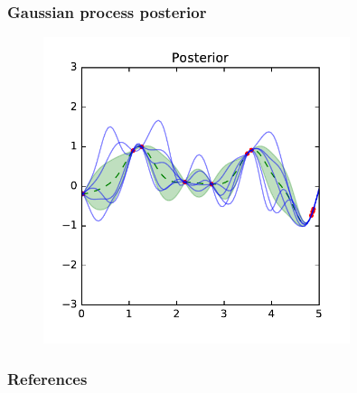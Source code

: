 \documentclass{beamer}
\begin{document}
\begin{frame}
    \frametitle{Gaussian process posterior}

    \begin{figure}
    \includegraphics[width=0.8\textwidth]{./figures/gp-posterior.pdf}
    \end{figure}

\end{frame}


\begin{frame}
    \frametitle{References}
    {\footnotesize
    
    }
\end{frame}
\end{document}
